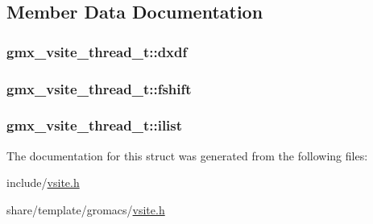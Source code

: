 \subsection{\-Member \-Data \-Documentation}
\hypertarget{structgmx__vsite__thread__t_a038e66c7022bdd502fb7e2f286778bec}{
\subsubsection[{dxdf}]{ {\bf gmx\-\_\-vsite\-\_\-thread\-\_\-t\-::dxdf}}}\label{structgmx__vsite__thread__t_a038e66c7022bdd502fb7e2f286778bec}
\hypertarget{structgmx__vsite__thread__t_a506da294a614f1e8b2b02bc3a6934049}{
\subsubsection[{fshift}]{ {\bf gmx\-\_\-vsite\-\_\-thread\-\_\-t\-::fshift}}}\label{structgmx__vsite__thread__t_a506da294a614f1e8b2b02bc3a6934049}
\hypertarget{structgmx__vsite__thread__t_ad27956a6f0d872b2050ac37de6931ccf}{
\subsubsection[{ilist}]{ {\bf gmx\-\_\-vsite\-\_\-thread\-\_\-t\-::ilist}}}\label{structgmx__vsite__thread__t_ad27956a6f0d872b2050ac37de6931ccf}


\-The documentation for this struct was generated from the following files\-:\begin{DoxyCompactItemize}
\item 
include/\hyperlink{include_2vsite_8h}{vsite.\-h}\item 
share/template/gromacs/\hyperlink{share_2template_2gromacs_2vsite_8h}{vsite.\-h}\end{DoxyCompactItemize}
